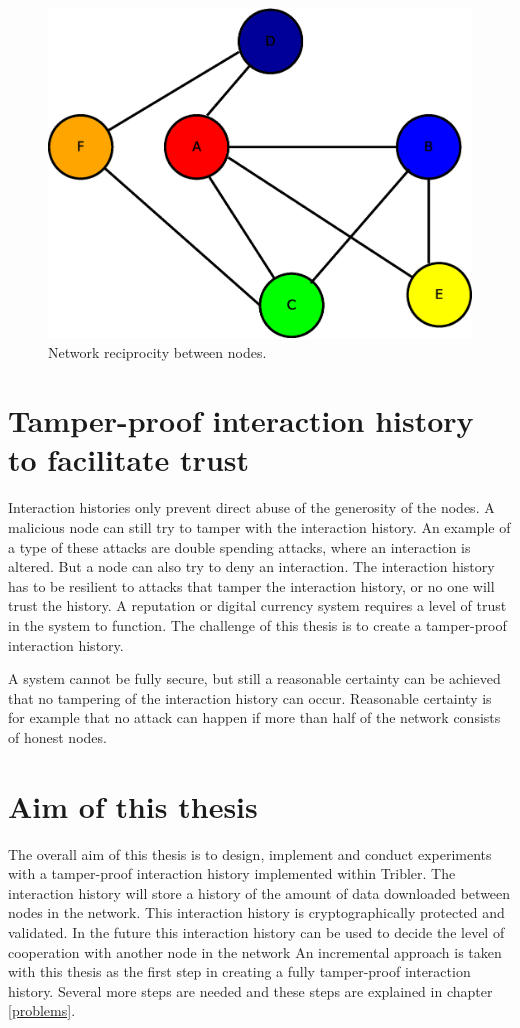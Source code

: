 \begin{figure}
	\centerline{\includegraphics[scale=0.3]{problemDescription/figs/network-reciprocity.eps}}
	\caption{Network reciprocity between nodes.}
	\label{fig:network-reciprocity}
\end{figure}

\section{Tamper-proof interaction history to facilitate trust}
Interaction histories only prevent direct abuse of the generosity of the nodes.
A malicious node can still try to tamper with the interaction history.
An example of a type of these attacks are double spending attacks\cite{Nakamoto-bitcoin},
where an interaction is altered.
But a node can also try to deny an interaction.
The interaction history has to be resilient to attacks that tamper the interaction history, 
or no one will trust the history. 
A reputation or digital currency system requires a level of trust in the system to function.
The challenge of this thesis is to create a tamper-proof interaction history.

A system cannot be fully secure, 
but still a reasonable certainty can be achieved that no tampering of the interaction history can occur.
Reasonable certainty is for example that no attack can happen 
if more than half of the network consists of honest nodes.

\section{Aim of this thesis}
\label{pb-aim}
The overall aim of this thesis is to design, implement and conduct experiments with a tamper-proof interaction history
implemented within Tribler.
The interaction history will store a history of the amount of data downloaded between nodes in the network.
This interaction history is cryptographically protected and validated.
In the future this interaction history can be used to decide the level of cooperation with another node in the network
An incremental approach is taken with this thesis as the first step in creating a fully tamper-proof interaction history.
Several more steps are needed and these steps are explained in chapter \ref{problems}.
